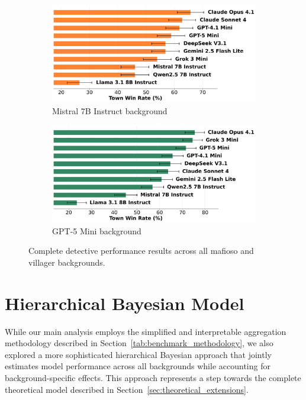 \documentclass{article}
\begin{document}
\begin{figure}[htbp]
    \begin{subfigure}[b]{0.48\textwidth}
        \centering
        \includegraphics[width=\textwidth]{../results/win_rates_disclose_mistral_7b_instruct.png}
        \caption{Mistral 7B Instruct background}
        \label{fig:detective_mistral_appendix}
    \end{subfigure}
    \hfill
    \begin{subfigure}[b]{0.48\textwidth}
        \centering
        \includegraphics[width=\textwidth]{../results/win_rates_disclose_gpt-5_mini.png}
        \caption{GPT-5 Mini background}
        \label{fig:detective_gpt5mini_appendix}
    \end{subfigure}
    \caption{Complete detective performance results across all mafioso and villager backgrounds.}
    \label{fig:detective_complete}
\end{figure}
\FloatBarrier


\section{Hierarchical Bayesian Model}
\label{appendix:hierarchical_bayesian}

While our main analysis employs the simplified and interpretable aggregation methodology described in Section~\ref{tab:benchmark_methodology}, we also explored a more sophisticated hierarchical Bayesian approach that jointly estimates model performance across all backgrounds while accounting for background-specific effects. This approach represents a step towards the complete theoretical model described in Section~\ref{sec:theoretical_extensions}.
\end{document}
